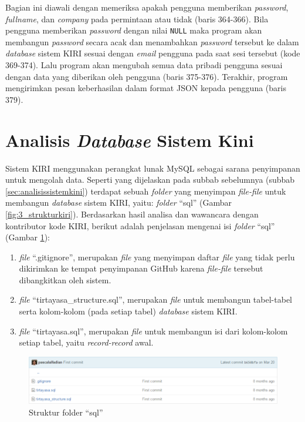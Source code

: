 Bagian ini diawali dengan memeriksa apakah pengguna memberikan \textit{password}, \textit{fullname}, dan \textit{company} pada permintaan atau tidak (baris 364-366). Bila pengguna memberikan \textit{password} dengan nilai \texttt{NULL} maka program akan membangun \textit{password} secara acak dan menambahkan \textit{password} tersebut ke dalam \textit{database} sistem KIRI sesuai dengan \textit{email} pengguna pada saat sesi tersebut (kode 369-374). Lalu program akan mengubah semua data pribadi pengguna sesuai dengan data yang diberikan oleh pengguna (baris 375-376). Terakhir, program mengirimkan pesan keberhasilan dalam format JSON kepada pengguna (baris 379).

\section{Analisis \textit{Database} Sistem Kini}
\label{sec:analisisdatabasesistemkini}
Sistem KIRI menggunakan perangkat lunak MySQL sebagai sarana penyimpanan untuk mengolah data. Seperti yang dijelaskan pada subbab sebelumnya (subbab \ref{sec:analisissistemkini}) terdapat sebuah \textit{folder} yang menyimpan \textit{file-file} untuk membangun \textit{database} sistem KIRI, yaitu: \textit{folder} ``sql'' (Gambar \ref{fig:3_strukturkiri}). Berdasarkan hasil analisa dan wawancara dengan kontributor kode KIRI, berikut adalah penjelasan mengenai isi \textit{folder} ``sql'' (Gambar \ref{fig:4_struktursql}):
\begin{enumerate}
	\item \textit{file} ``.gitignore'', merupakan \textit{file} yang menyimpan daftar \textit{file} yang tidak perlu dikirimkan ke tempat penyimpanan GitHub karena \textit{file-file} tersebut dibangkitkan oleh sistem.
	\item \textit{file} ``tirtayasa\_structure.sql'', merupakan \textit{file} untuk membangun tabel-tabel serta kolom-kolom (pada setiap tabel) \textit{database} sistem KIRI.
	\item \textit{file} ``tirtayasa.sql'', merupakan \textit{file} untuk membangun isi dari kolom-kolom setiap tabel, yaitu \textit{record-record} awal.
\end{enumerate}

\begin{figure}[htbp]
	\centering
		\includegraphics[scale=0.5]{Gambar/4_struktursql.png}
	\caption{Struktur folder ``sql''}
	\label{fig:4_struktursql}
\end{figure}

